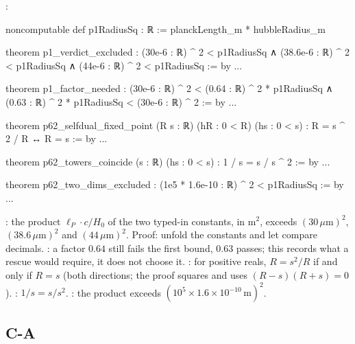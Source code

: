 :
\begin{leancode}
noncomputable def p1RadiusSq : ℝ := planckLength_m * hubbleRadius_m

theorem p1_verdict_excluded :
    (30e-6 : ℝ) ^ 2 < p1RadiusSq ∧ (38.6e-6 : ℝ) ^ 2 < p1RadiusSq ∧
      (44e-6 : ℝ) ^ 2 < p1RadiusSq := by ...

theorem p1_factor_needed :
    (30e-6 : ℝ) ^ 2 < (0.64 : ℝ) ^ 2 * p1RadiusSq ∧
      (0.63 : ℝ) ^ 2 * p1RadiusSq < (30e-6 : ℝ) ^ 2 := by ...

theorem p62_selfdual_fixed_point (R s : ℝ) (hR : 0 < R) (hs : 0 < s) :
    R = s ^ 2 / R ↔ R = s := by ...

theorem p62_towers_coincide (s : ℝ) (hs : 0 < s) : 1 / s = s / s ^ 2 := by ...

theorem p62_two_dims_excluded : (1e5 * 1.6e-10 : ℝ) ^ 2 < p1RadiusSq := by ...
\end{leancode}
\begin{leanbox}
: the product $\ell_P\cdot c/H_0$ of the two typed-in constants, in
m$^2$, exceeds $(30\,\mu\text{m})^2$, $(38.6\,\mu\text{m})^2$ and $(44\,\mu\text{m})^2$. Proof:
unfold the constants and let  compare decimals.
: a factor $0.64$ still fails the first bound, $0.63$ passes; this
records what a rescue would require, it does not choose it. :
for positive reals, $R=s^2/R$ if and only if $R=s$ (both directions; the proof squares and uses
$(R-s)(R+s)=0$). : $1/s=s/s^2$. : the
product exceeds $(10^5\times1.6\times10^{-10}\,\text{m})^2$.
\end{leanbox}

\subsection{C-A}

